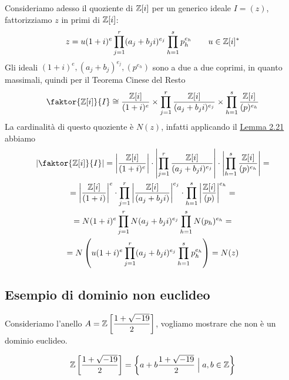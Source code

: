 \documentclass[11pt]{scrartcl}
\begin{document}
Consideriamo adesso il quoziente di $\mathbb Z[i]$ per un generico ideale $I = (z)$,
fattorizziamo $z$ in primi di $\mathbb Z[i]$:
\[
    z = u(1 + i)^e\prod_{j = 1}^r (a_j + b_j i)^{e_j}\prod_{h = 1}^s p_h^{e_h}
    \qquad u \in \mathbb Z[i]^*
\]
Gli ideali $(1 + i)^e, (a_j + b_j)^{e_j}, (p^{e_h})$ sono a due a due coprimi,
in quanto massimali, quindi per il Teorema Cinese del Resto
\[
    \faktor{\ZZ[i]}{I} \cong \frac{\ZZ[i]}{(1 + i)^e}\times
    \prod_{j = 1}^r\frac{\ZZ[i]}{(a_j + b_ji)^{e_j}}
    \times \prod_{h = 1}^s \frac{\ZZ[i]}{(p)^{e_h}}
\]
La cardinalità di questo quoziente è $N(z)$, infatti applicando il 
\hyperref[lemma2.21]{Lemma 2.21} abbiamo
\begin{multline*}
    \left|\faktor{\ZZ[i]}{I}\right| = \left|\frac{\ZZ[i]}{(1 + i)^e}\right|\cdot
    \left|\prod_{j = 1}^r\frac{\ZZ[i]}{(a_j + b_ji)^{e_j}}\right|\cdot
    \left|\prod_{h = 1}^s \frac{\ZZ[i]}{(p)^{e_h}}\right| = \\
    = \left|\frac{\ZZ[i]}{(1 + i)}\right|^e\cdot
    \prod_{j = 1}^r \left|\frac{\ZZ[i]}{(a_j + b_ji)}\right| ^{e_j}\cdot
    \prod_{h = 1}^s \left|\frac{\ZZ[i]}{(p)}\right| ^{e_h} = \\
    = N(1 + i)^e\prod_{j = 1}^r N(a_j + b_ji)^{e_j}\prod_{h = 1}^s N(p_h)^{e_h} = \\
    = N\left(u(1 + i)^e\prod_{j = 1}^r (a_j + b_j i)^{e_j}\prod_{h = 1}^s p_h^{e_h}\right)
    = N(z)\\
\end{multline*}

\newpage

\subsection{Esempio di dominio non euclideo}

Consideriamo l'anello $\displaystyle A = \mathbb Z\left[\frac{1 + \sqrt{-19}}{2}\right]$,
vogliamo mostrare che non è un dominio euclideo. 

\begin{proposition}
    \[
        \mathbb Z\left[\frac{1 + \sqrt{-19}}{2}\right] = 
        \left\{a + b\frac{1 + \sqrt{-19}}{2}\Bigm| a, b \in \mathbb Z\right\}
    \]
\end{proposition}
\end{document}

